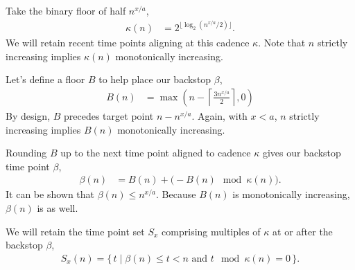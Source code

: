 Take the binary floor of half $n^{x/a}$,
\begin{align*}
  \kappa(n)
  &=
  2^{\lfloor \log_{2}(n^{x/a}/2) \rfloor}.
\end{align*}
We will retain recent time points aligning at this cadence $\kappa$.
Note that $n$ strictly increasing implies $\kappa(n)$ monotonically increasing.

Let's define a floor $B$ to help place our backstop $\beta$,
\begin{align*}
  B(n)
  &=
  \max \left(
    n - \left\lceil  \frac{3n^{x/a}}{2} \right\rceil,
    0
  \right)
\end{align*}
By design, $B$ precedes target point $n - n^{x/a}$.
Again, with $x < a$, $n$ strictly increasing implies $B(n)$ monotonically increasing.

Rounding $B$ up to the next time point aligned to cadence $\kappa$ gives our backstop time point $\beta$,
\begin{align*}
  \beta(n)
  &=
  B(n) + \big(-B(n) \mod \kappa(n)\big).
\end{align*}
It can be shown that $\beta(n) \leq n^{x/a}$.
Because $B(n)$ is monotonically increasing, $\beta(n)$ is as well.

We will retain the time point set $S_x$ comprising multiples of $\kappa$ at or after the backstop $\beta$,
\begin{align*}
  S_x(n) = \{\, t \mid \beta(n) \leq t < n \text{ and } t \mod \kappa(n) = 0 \,\}.
\end{align*}

